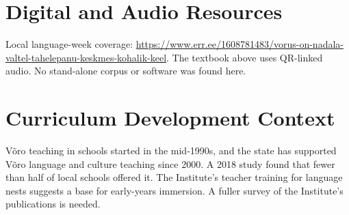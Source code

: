 \documentclass[12pt]{article}
\begin{document}
\section{Digital and Audio Resources}
Local language-week coverage: \url{https://www.err.ee/1608781483/vorus-on-nadala-valtel-tahelepanu-keskmes-kohalik-keel}. The textbook above uses QR-linked audio. No stand-alone corpus or software was found here.
\section{Curriculum Development Context}
V\~oro teaching in schools started in the mid-1990s, and the state has supported V\~oro language and culture teaching since 2000. A 2018 study found that fewer than half of local schools offered it. The Institute's teacher training for language nests suggests a base for early-years immersion. A fuller survey of the Institute's publications is needed.
\end{document}
